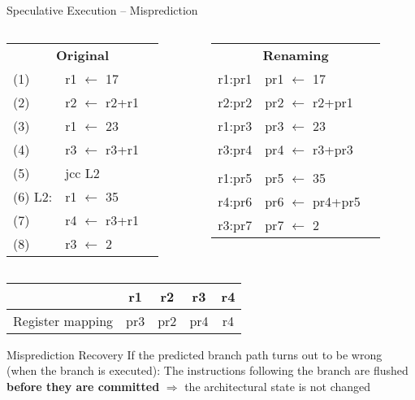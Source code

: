 \documentclass[aspectratio=169,12pt]{beamer}
\begin{document}
\begin{frame}{Speculative Execution -- Misprediction}
  \begin{columns}
    \begin{column}{0.5\textwidth}
      \begin{tabular}{lll}
        \multicolumn{3}{c}{\textbf{Original}} \\
        (1) & r1 $\leftarrow$ 17 & \\
        (2) & r2 $\leftarrow$ r2+r1 & \\
        (3) & r1 $\leftarrow$ 23 & \\
        (4) & r3 $\leftarrow$ r3+r1 & \\
        (5) & jcc L2 & \\
        \rowcolor{pink!30} (6) L2: & r1 $\leftarrow$ 35 & \\
        \rowcolor{pink!30} (7) & r4 $\leftarrow$ r3+r1 & \\
        \rowcolor{pink!30} (8) & r3 $\leftarrow$ 2 & \\
      \end{tabular}
    \end{column}
    
    \begin{column}{0.5\textwidth}
      \begin{tabular}{lll}
        \multicolumn{3}{c}{\textbf{Renaming}} \\
        r1:pr1 & pr1 $\leftarrow$ 17 & \\
        r2:pr2 & pr2 $\leftarrow$ r2+pr1 & \\
        r1:pr3 & pr3 $\leftarrow$ 23 & \\
        r3:pr4 & pr4 $\leftarrow$ r3+pr3 & \\
        & & \\
        \rowcolor{pink!30} r1:pr5 & pr5 $\leftarrow$ 35 & \\
        \rowcolor{pink!30} r4:pr6 & pr6 $\leftarrow$ pr4+pr5 & \\
        \rowcolor{pink!30} r3:pr7 & pr7 $\leftarrow$ 2 & \\
      \end{tabular}
    \end{column}
  \end{columns}
  
  \vspace{0.3cm}
  \begin{center}
    \begin{tabular}{|c|c|c|c|c|}
      \hline
      & r1 & r2 & r3 & r4 \\
      \hline
      Register mapping & pr3 & pr2 & pr4 & r4 \\
      \hline
    \end{tabular}
  \end{center}
  
  \begin{block}{Misprediction Recovery}
    If the predicted branch path turns out to be wrong (when the branch is executed):
    The instructions following the branch are flushed \textbf{before they are committed}
    $\Rightarrow$ the architectural state is not changed
  \end{block}
\end{frame}
\end{document}
